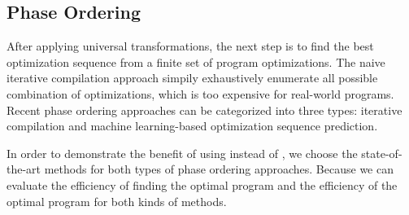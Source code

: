 

\subsection{Phase Ordering}
After applying universal transformations, the next step is to find the best optimization sequence from a finite set of program optimizations.
The naive iterative compilation approach simpily exhaustively enumerate all possible combination of optimizations, which is too expensive for real-world programs. 
Recent phase ordering approaches can be categorized into three types: iterative compilation and machine learning-based optimization sequence prediction.

In order to demonstrate the benefit of using \prob instead of \spo{}, we choose the state-of-the-art methods for both types of phase ordering approaches. Because we can evaluate the efficiency of finding the optimal program and the efficiency of the optimal program for both kinds of methods.

